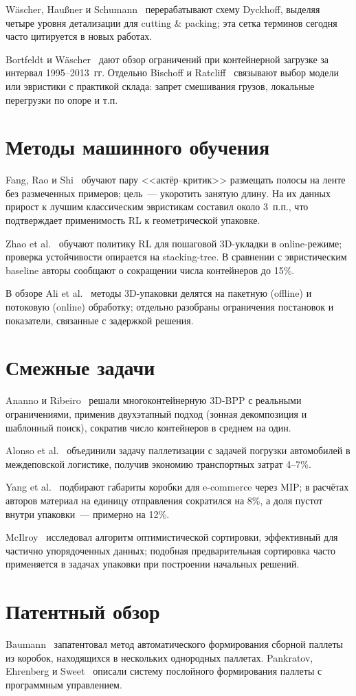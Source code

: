 Wäscher, Haußner и Schumann~\cite{Wascher2007} перерабатывают схему Dyckhoff, выделяя четыре уровня детализации для cutting \& packing; эта сетка терминов сегодня часто цитируется в новых работах.

Bortfeldt и Wäscher~\cite{Bortfeldt2013} дают обзор ограничений при контейнерной загрузке за интервал 1995--2013~гг. Отдельно Bischoff и Ratcliff~\cite{Bischoff1995} связывают выбор модели или эвристики с практикой склада: запрет смешивания грузов, локальные перегрузки по опоре и т.п.

\section{Методы машинного обучения}

Fang, Rao и Shi~\cite{Fang2023} обучают пару <<актёр--критик>> размещать полосы на ленте без размеченных примеров; цель~--- укоротить занятую длину. На их данных прирост к лучшим классическим эвристикам составил около 3~п.п., что подтверждает применимость RL к геометрической упаковке.

Zhao et al.~\cite{Zhao2021} обучают политику RL для пошаговой 3D-укладки в online-режиме; проверка устойчивости опирается на stacking-tree. В сравнении с эвристическим baseline авторы сообщают о сокращении числа контейнеров до 15\%.

В обзоре Ali et al.~\cite{Ali2022} методы 3D-упаковки делятся на пакетную (offline) и потоковую (online) обработку; отдельно разобраны ограничения постановок и показатели, связанные с задержкой решения.

\section{Смежные задачи}

Ananno и Ribeiro~\cite{Ananno2024} решали многоконтейнерную 3D-BPP с реальными ограничениями, применив двухэтапный подход (зонная декомпозиция и шаблонный поиск), сократив число контейнеров в среднем на один.

Alonso et al.~\cite{Alonso2016} объединили задачу паллетизации с задачей погрузки автомобилей в междеповской логистике, получив экономию транспортных затрат 4--7\%.

Yang et al.~\cite{Yang2023} подбирают габариты коробки для e-commerce через MIP; в расчётах авторов материал на единицу отправления сократился на 8\%, а доля пустот внутри упаковки~--- примерно на 12\%.

McIlroy~\cite{TimSort_teor} исследовал алгоритм оптимистической сортировки, эффективный для частично упорядоченных данных; подобная предварительная сортировка часто применяется в задачах упаковки при построении начальных решений.

\section{Патентный обзор}

Baumann~\cite{USPatent8423178B2} запатентовал метод автоматического формирования сборной паллеты из коробок, находящихся в нескольких однородных паллетах. Pankratov, Ehrenberg и Sweet~\cite{US11613434B2} описали систему послойного формирования паллеты с программным управлением.
